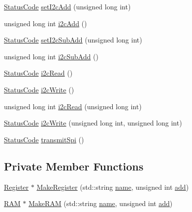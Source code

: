 \begin{DoxyCompactItemize}
\item 
\hyperlink{classStatusCode}{Status\+Code} \hyperlink{classFePGA_a2da860f836e04ecc54056d0bf8cc8f98}{set\+I2c\+Add} (unsigned long int)
\item 
unsigned long int \hyperlink{classFePGA_a26b690b730b5f668ab28fb8deab8326b}{i2c\+Add} ()
\item 
\hyperlink{classStatusCode}{Status\+Code} \hyperlink{classFePGA_a37c1ee5bf89667c641f321479697166f}{set\+I2c\+Sub\+Add} (unsigned long int)
\item 
unsigned long int \hyperlink{classFePGA_ab51ac1c71e33f7444212de0e89e1f436}{i2c\+Sub\+Add} ()
\item 
\hyperlink{classStatusCode}{Status\+Code} \hyperlink{classFePGA_a939c5c23077210a2ad851a12694657a4}{i2c\+Read} ()
\item 
\hyperlink{classStatusCode}{Status\+Code} \hyperlink{classFePGA_a27b9c9bb486cea35b1bbcac5da96f527}{i2c\+Write} ()
\item 
unsigned long int \hyperlink{classFePGA_adf1c43786131d0f500b4662a877229c7}{i2c\+Read} (unsigned long int)
\item 
\hyperlink{classStatusCode}{Status\+Code} \hyperlink{classFePGA_a45e1cfdf1f303f3958bf6a83c4e8039b}{i2c\+Write} (unsigned long int, unsigned long int)
\item 
\hyperlink{classStatusCode}{Status\+Code} \hyperlink{classFePGA_ac7698a9f59f7290a6bb648030976597f}{transmit\+Spi} ()
\end{DoxyCompactItemize}
\subsection*{Private Member Functions}
\begin{DoxyCompactItemize}
\item 
\hyperlink{classRegister}{Register} $\ast$ \hyperlink{classFePGA_a83286ca5b6d8dbab0e95903d8f424783}{Make\+Register} (std\+::string \hyperlink{classObject_a300f4c05dd468c7bb8b3c968868443c1}{name}, unsigned int \hyperlink{classAttrib_a235f773af19c900264a190b00a3b4ad7}{add})
\item 
\hyperlink{classRAM}{R\+AM} $\ast$ \hyperlink{classFePGA_a77a1e1c120fca21125b5e43f3679d522}{Make\+R\+AM} (std\+::string \hyperlink{classObject_a300f4c05dd468c7bb8b3c968868443c1}{name}, unsigned int \hyperlink{classAttrib_a235f773af19c900264a190b00a3b4ad7}{add})
\end{DoxyCompactItemize}
